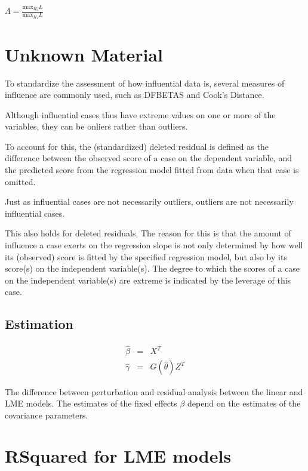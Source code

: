 \documentclass[12pt, a4paper]{report}
\theoremstyle{plain}
\theoremstyle{definition}
\theoremstyle{remark}
\begin{document}

$\Lambda = \frac{\mbox{max}_{H_{0}}L}{\mbox{max}_{H_{1}}L}$
	

\section{Unknown Material}


To standardize the assessment of how influential data is, several measures of influence are commonly used, such as DFBETAS 
and Cook’s Distance.

Although influential cases thus have extreme values on one or more of the variables, they can be onliers
rather than outliers. 

To account for this, the (standardized) deleted residual is defined as the difference between
the observed score of a case on the dependent variable, and the predicted score from the regression
model fitted from data when that case is omitted.

Just as influential cases are not necessarily outliers, outliers are not necessarily influential cases. 

This also holds for deleted residuals. The reason for this is that the amount of influence a case exerts on the regression slope is not only determined by how well its (observed) score is fitted by the specified regression model, but also by its score(s) on the independent variable(s). The degree to which the scores of a case on the independent variable(s) are extreme is indicated by the leverage of this case. 




\subsection{Estimation}

\begin{eqnarray}
\hat{\beta} &=& X^{T} \\
\hat{\gamma} &=& G(\hat{\theta})Z^{T}
\end{eqnarray}

The difference between perturbation and residual analysis between the linear and LME models.
The estimates of the fixed effects $\beta$ depend on the estimates of the covariance parameters.




	

	\section{RSquared for LME models}
	
\end{document}

